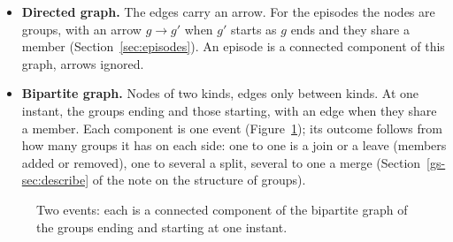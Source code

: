 \begin{itemize}
  \item \textbf{Directed graph.} The edges carry an arrow. For the episodes the nodes are
        groups, with an arrow $g\to g'$ when $g'$ starts as $g$ ends and they share a member
        (Section~\ref{sec:episodes}). An episode is a connected component of this graph, arrows
        ignored.
  \item \textbf{Bipartite graph.} Nodes of two kinds, edges only between kinds. At one instant, the
        groups ending and those starting, with an edge when they share a member. Each
        component is one event (Figure~\ref{fig:events}); its outcome follows from how many
        groups it has on each side: one to one is a join or a leave (members added or
        removed), one to several a split, several to one a merge (Section~\ref{gs-sec:describe} of the note on the structure of groups).
\end{itemize}

\begin{figure}
\centering
{}
\caption{Two events: each is a connected component of the bipartite graph of the groups
ending and starting at one instant.}
\label{fig:events}
\end{figure}
